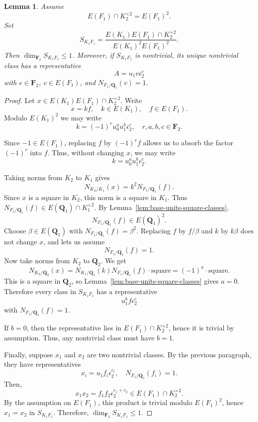 \documentclass{article}
\numberwithin{equation}{section}
\theoremstyle{plain}  %
\newtheorem{lemma}{Lemma}[section]
\theoremstyle{definition}
\begin{document}
\begin{lemma}\label{lem:K1F1-one-class}
Assume
$$
E(F_1) \cap K_2^{\times 2}=E(F_1)^2.
$$
Set
$$
S_{K_1F_1}=\frac{E(K_1)E(F_1) \cap K_2^{\times 2}}{E(K_1)^2E(F_1)^2}.
$$
Then $\dim_{\mathbf F_2} S_{K_1F_1} \le 1$.
Moreover, if $S_{K_1F_1}$ is nontrivial, its unique nontrivial class has a representative
$$
A= u_1 v \epsilon_2^e
$$
with $e \in \mathbf F_2$, $v \in E(F_1)$, and $N_{F_1/\mathbf Q_1}(v)=1$.
\end{lemma}

\begin{proof}
Let $x \in E(K_1)E(F_1) \cap K_2^{\times 2}$. Write
$$
x=kf, \quad k \in E(K_1), \quad f \in E(F_1).
$$
Modulo $E(K_1)^2$ we may write
$$
k=(-1)^r u_0^a u_1^b\epsilon_2^c, \quad r,a,b,c \in \mathbf F_2.
$$

Since $-1 \in E(F_1)$, replacing $f$ by $(-1)^r f$ allows us to absorb the factor $(-1)^r$ into $f$. Thus, without changing $x$, we may write
\[
k=u_0^a u_1^b\epsilon_2^c.
\]

Taking norms from $K_2$ to $K_1$ gives
$$
N_{K_2/K_1}(x)=k^2N_{F_1/\mathbf Q_1}(f).
$$
Since $x$ is a square in $K_2$, this norm is a square in $K_1$. Thus $N_{F_1/\mathbf Q_1}(f) \in E(\mathbf Q_1) \cap K_1^{\times 2}$. By Lemma~\ref{lem:base-units-square-classes},
$$
N_{F_1/\mathbf Q_1}(f) \in E(\mathbf Q_1)^2.
$$
Choose $\beta \in E(\mathbf Q_1)$  with $N_{F_1/\mathbf Q_1}(f)=\beta^2$. Replacing $f$ by $f/\beta$ and $k$ by $k\beta$ does not change $x$, and lets us assume
$$
N_{F_1/\mathbf Q_1}(f)=1.
$$
Now take norms from $K_2$ to $\mathbf Q_2$. We get
$$
N_{K_2/\mathbf Q_2}(x)=N_{K_1/\mathbf Q_1}(k)N_{F_1/\mathbf Q_1}(f) \cdot \text{square}=(-1)^a \cdot \text{square}.
$$
This is a square in $\mathbf Q_2$, so Lemma~\ref{lem:base-units-square-classes} gives $a=0$.
Therefore every class in $S_{K_1F_1}$ has a representative
$$
u_1^b f\epsilon_2^c
$$
with $N_{F_1/\mathbf Q_1}(f)=1$.

If $b=0$, then the representative lies in $E(F_1) \cap K_2^{\times 2}$, hence it is trivial by assumption. Thus, any nontrivial class must have $b=1$.

Finally, suppose $x_1$ and $x_2$ are two nontrivial classes. By the previous paragraph, they have representatives
$$
x_i=u_1f_i\epsilon_2^{c_i}, \quad N_{F_1/\mathbf Q_1}(f_i)=1.
$$
Then,
$$
x_1x_2=f_1f_2\epsilon_2^{c_1+c_2} \in E(F_1) \cap K_2^{\times 2}.
$$
By the assumption on $E(F_1)$, this product is trivial modulo $E(F_1)^2$, hence $x_1=x_2$ in $S_{K_1F_1}$. Therefore, $\dim_{\mathbf F_2} S_{K_1F_1} \le 1$.
\end{proof}
\end{document}
